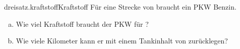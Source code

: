 \begin{exercise}{dreisatz.kraftstoff}{Kraftstoff}
  \ifproblem\problem
    Für eine Strecke von  braucht ein PKW  Benzin.
    \begin{enumerate}[a)]
      \item Wie viel Kraftstoff braucht der PKW für ?
      \item Wie viele Kilometer kann er mit einem Tankinhalt von  zurücklegen?
    \end{enumerate}
  \fi
\end{exercise}

